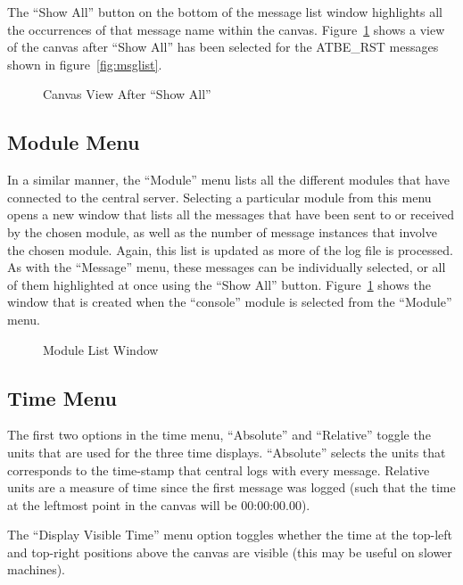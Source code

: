 The ``Show All'' button on the bottom of the message list window highlights all
the occurrences of that message name within the
canvas. Figure~\ref{fig:showall} shows a view of the canvas after ``Show All''
has been selected for the ATBE\_RST messages shown in
figure~\ref{fig:msglist}.

\begin{figure}[htp]
\centerline{\epsfysize=3.5in }
\caption{Canvas View After ``Show All''}
\label{fig:showall}
\end{figure}

\subsection{Module Menu}

In a similar manner, the ``Module'' menu lists all the different modules that
have connected to the central server. Selecting a particular module from this
menu opens a new window that lists all the messages that have been sent to
or received by the chosen module, as well as the number of message instances that
involve the chosen module.  Again, this list is updated as more of the log
file is processed.  As with the ``Message'' menu, these messages can be
individually selected, or all of them highlighted at once using the ``Show
All'' button. Figure~\ref{fig:showall} shows the window that is created
when the ``console'' module is selected from the ``Module'' menu.

\begin{figure}[htp]
\centerline{\epsfysize=2in }
\caption{Module List Window}
\label{fig:modlist}
\end{figure}

\subsection{Time Menu}

The first two options in the time menu, ``Absolute'' and ``Relative''
toggle the units that are used for the three time displays. ``Absolute''
selects the units that corresponds to the time-stamp that central logs
with every message. Relative units are a measure of time since the
first message was logged (such that the time at the leftmost point in
the canvas will be 00:00:00.00).

The ``Display Visible Time'' menu option toggles whether the
time at the top-left and top-right positions above the canvas are
visible (this may be useful on slower machines).

